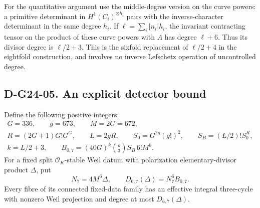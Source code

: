 For the quantitative argument use the middle-degree version on the curve
powers: a primitive determinant in \(H^1(C_i)^{\otimes h_i}\) pairs with
the inverse-character determinant in the same degree \(h_i\).  If
\(\ell=\sum_i|n_i|h_i\), the invariant contracting tensor on the product
of these curve powers with \(A\) has degree \(\ell+6\).  Thus its divisor
degree is \(\ell/2+3\).  This is the sixfold replacement of
\(\ell/2+4\) in the eightfold construction, and involves no inverse
Lefschetz operation of uncontrolled degree.

\subsection*{D-G24-05. An explicit detector bound}

Define the following positive integers:
\[
\begin{gathered}
 G=336,\qquad g=673,\qquad M=2G=672,\\
 R=(2G+1)G!G^G,\qquad L=2gR,\qquad
 S_0=G^{2g}(g!)^2,\qquad S_B=(L/2)!S_0^R,\\
 k=L/2+3,\qquad
 B_{0,7}=(40G)^k\binom{k}{3}S_B\,6!M^6.
\end{gathered}
\]
For a fixed split \(\mathcal O_K\)-stable Weil datum with polarization
elementary-divisor product \(\Delta\), put
\begin{equation}\label{eq:g24-detector-bound}
 N_7=4M^6\Delta,\qquad
 \boxed{D_{6,7}(\Delta)=N_7^6B_{0,7}.}
\end{equation}
Every fibre of its connected fixed-data family has an effective integral
three-cycle with nonzero Weil projection and degree at most
\(D_{6,7}(\Delta)\).

